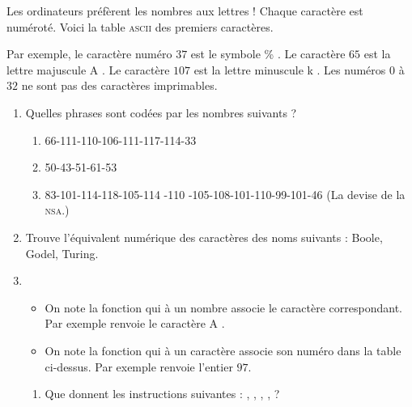 \documentclass[class=report,crop=false, 12pt]{standalone}
\begin{document}
\begin{activite}

Les ordinateurs préfèrent les nombres aux lettres ! Chaque caractère est numéroté.
Voici la table \textsc{ascii} des premiers caractères.


Par exemple, le caractère numéro $37$ est le symbole \og \% \fg{}.
Le caractère $65$ est la lettre majuscule \og A \fg{}. Le caractère $107$ est la lettre minuscule \og k \fg{}. Les numéros $0$ à $32$ ne sont pas des caractères imprimables.

\begin{enumerate}
  \item Quelles phrases sont codées par les nombres suivants ?
  \begin{enumerate}
    \item 66-111-110-106-111-117-114-33
   

    \item 50-43-51-61-53 
    
    
    \item 83-101-114-118-105-114 -110  -105-108-101-110-99-101-46 (La devise de la \textsc{nsa}.)
   
  \end{enumerate}

  \item Trouve l'équivalent numérique des caractères des noms suivants :
  Boole, Godel, Turing.
  
  \item 
  \begin{itemize}
    \item On note  la fonction qui à un nombre associe le caractère correspondant.
  Par exemple  renvoie le caractère \og A \fg{}.
    \item On note  la fonction qui à un caractère associe son numéro dans la table ci-dessus. Par exemple  renvoie l'entier $97$.
  \end{itemize}
  \begin{enumerate}
    \item Que donnent les instructions suivantes :
    , , , 
     ,  ?
     

\end{enumerate}
\end{enumerate}
\end{activite}
\end{document}
